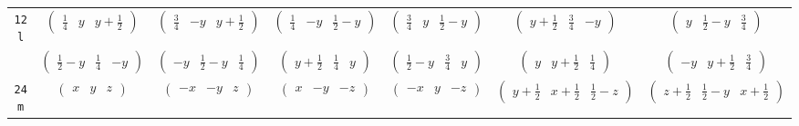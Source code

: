 \documentclass[fleqn,9pt,landscape]{jsarticle}
\begin{document}
\begin{center}
\begin{longtable}{ccccccc}
{\tt 12l} & $ \begin{pmatrix} \frac{1}{4} & y & y + \frac{1}{2} \end{pmatrix} $ & $ \begin{pmatrix} \frac{3}{4} & - y & y + \frac{1}{2} \end{pmatrix} $ & $ \begin{pmatrix} \frac{1}{4} & - y & \frac{1}{2} - y \end{pmatrix} $ & $ \begin{pmatrix} \frac{3}{4} & y & \frac{1}{2} - y \end{pmatrix} $ & $ \begin{pmatrix} y + \frac{1}{2} & \frac{3}{4} & - y \end{pmatrix} $ & $ \begin{pmatrix} y & \frac{1}{2} - y & \frac{3}{4} \end{pmatrix} $ \\
& $ \begin{pmatrix} \frac{1}{2} - y & \frac{1}{4} & - y \end{pmatrix} $ & $ \begin{pmatrix} - y & \frac{1}{2} - y & \frac{1}{4} \end{pmatrix} $ & $ \begin{pmatrix} y + \frac{1}{2} & \frac{1}{4} & y \end{pmatrix} $ & $ \begin{pmatrix} \frac{1}{2} - y & \frac{3}{4} & y \end{pmatrix} $ & $ \begin{pmatrix} y & y + \frac{1}{2} & \frac{1}{4} \end{pmatrix} $ & $ \begin{pmatrix} - y & y + \frac{1}{2} & \frac{3}{4} \end{pmatrix} $ \\ \hline
{\tt 24m} & $ \begin{pmatrix} x & y & z \end{pmatrix} $ & $ \begin{pmatrix} - x & - y & z \end{pmatrix} $ & $ \begin{pmatrix} x & - y & - z \end{pmatrix} $ & $ \begin{pmatrix} - x & y & - z \end{pmatrix} $ & $ \begin{pmatrix} y + \frac{1}{2} & x + \frac{1}{2} & \frac{1}{2} - z \end{pmatrix} $ & $ \begin{pmatrix} z + \frac{1}{2} & \frac{1}{2} - y & x + \frac{1}{2} \end{pmatrix} $ \\

\end{longtable}
\end{center}
\end{document}
